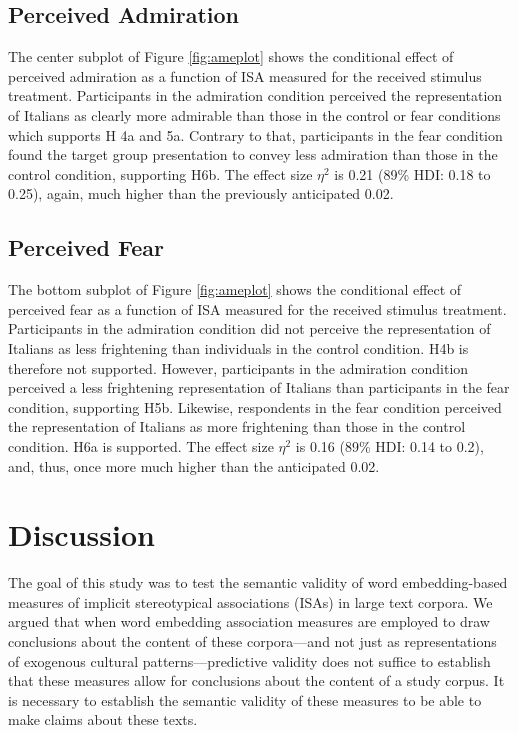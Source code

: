 \subsection{Perceived Admiration}

The center subplot of Figure \ref{fig:ameplot} shows the conditional effect of perceived admiration as a function of ISA measured for the received stimulus treatment. Participants in the admiration condition perceived the representation of Italians as clearly more admirable than those in the control or fear conditions which supports H 4a and 5a. Contrary to that, participants in the fear condition found the target group presentation to convey less admiration than those in the control condition, supporting H6b. The effect size $\eta^2$ is 0.21 (89\% HDI: 0.18 to 0.25), again, much higher than the previously anticipated 0.02.

\subsection{Perceived Fear}

The bottom subplot of Figure \ref{fig:ameplot} shows the conditional effect of perceived fear as a function of ISA measured for the received stimulus treatment. Participants in the admiration condition did not perceive the representation of Italians as less frightening than individuals in the control condition. H4b is therefore not supported. However, participants in the admiration condition perceived a less frightening representation of Italians than participants in the fear condition, supporting H5b. Likewise, respondents in the fear condition perceived the representation of Italians as more frightening than those in the control condition. H6a is supported. The effect size $\eta^2$ is 0.16 (89\% HDI: 0.14 to 0.2), and, thus, once more much higher than the anticipated 0.02.

\section{Discussion}

The goal of this study was to test the semantic validity of word embedding-based measures of implicit stereotypical associations (ISAs) in large text corpora. We argued that when word embedding association measures are employed to draw conclusions about the content of these corpora---and not just as representations of exogenous cultural patterns---predictive validity does not suffice to establish that these measures allow for conclusions about the content of a study corpus. It is necessary to establish the semantic validity of these measures to be able to make claims about these texts.

